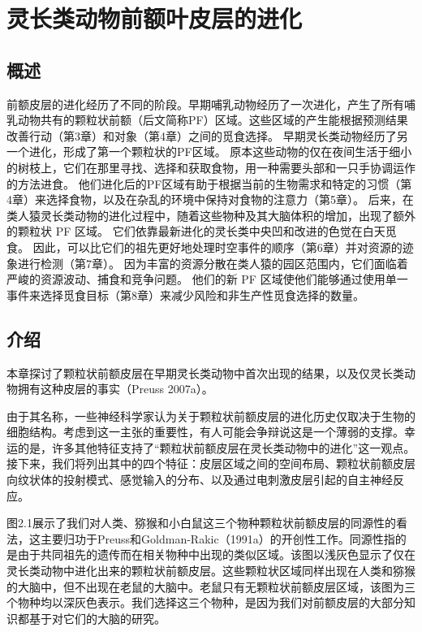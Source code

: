 \chapter{灵长类动物前额叶皮层的进化}

\section{概述}
前额皮层的进化经历了不同的阶段。早期哺乳动物经历了一次进化，产生了所有哺乳动物共有的颗粒状前额（后文简称PF）区域。这些区域的产生能根据预测结果改善行动（第3章）和对象（第4章）之间的觅食选择。
早期灵长类动物经历了另一个进化，形成了第一个颗粒状的PF区域。
原本这些动物的仅在夜间生活于细小的树枝上，它们在那里寻找、选择和获取食物，用一种需要头部和一只手协调运作的方法进食。
他们进化后的PF区域有助于根据当前的生物需求和特定的习惯（第4章）来选择食物，以及在杂乱的环境中保持对食物的注意力（第5章）。
后来，在类人猿灵长类动物的进化过程中，随着这些物种及其大脑体积的增加，出现了额外的颗粒状 PF 区域。
它们依靠最新进化的灵长类中央凹和改进的色觉在白天觅食。 因此，可以比它们的祖先更好地处理时空事件的顺序（第6章）并对资源的迹象进行检测（第7章）。
因为丰富的资源分散在类人猿的园区范围内，它们面临着严峻的资源波动、捕食和竞争问题。
他们的新 PF 区域使他们能够通过使用单一事件来选择觅食目标（第8章）来减少风险和非生产性觅食选择的数量。

\section{介绍}
本章探讨了颗粒状前额皮层在早期灵长类动物中首次出现的结果，以及仅灵长类动物拥有这种皮层的事实（Preuss 2007a）。

由于其名称，一些神经科学家认为关于颗粒状前额皮层的进化历史仅取决于生物的细胞结构。考虑到这一主张的重要性，有人可能会争辩说这是一个薄弱的支撑。幸运的是，许多其他特征支持了“颗粒状前额皮层在灵长类动物中的进化”这一观点。接下来，我们将列出其中的四个特征：皮层区域之间的空间布局、颗粒状前额皮层向纹状体的投射模式、感觉输入的分布、以及通过电刺激皮层引起的自主神经反应。

图2.1展示了我们对人类、猕猴和小白鼠这三个物种颗粒状前额皮层的同源性的看法，这主要归功于Preuss和Goldman-Rakic（1991a）的开创性工作。同源性指的是由于共同祖先的遗传而在相关物种中出现的类似区域。该图以浅灰色显示了仅在灵长类动物中进化出来的颗粒状前额皮层。这些颗粒状区域同样出现在人类和猕猴的大脑中，但不出现在老鼠的大脑中。老鼠只有无颗粒状前额皮层区域，该图为三个物种均以深灰色表示。我们选择这三个物种，是因为我们对前额皮层的大部分知识都基于对它们的大脑的研究。

